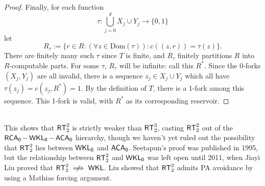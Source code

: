 \documentclass{amsart}
\begin{document}
\begin{proof}
		
		Finally, for each function
		$$
		\tau : \bigcup_{j=0}^d X_j\cup Y_j \to \{0,1\}
		$$
		let
		$$
		R_{\tau} := \{r\in R : (\forall z\in \textrm{Dom}(\tau)): c((z,r)) = \tau(z) \}.
		$$ 
		There are finitely many such $\tau$ since $T$ is finite, and $R_{\tau}$ finitely partitions $R$ into $R$-computable parts. For some $\tau$, $R_{\tau}$ will be infinite: call this $R^*$. Since the $0$-forks $(X_j,Y_j)$ are all invalid, there is a sequence $z_j\in X_j\cup Y_j$ which all have $\tau(z_j) = c(z_j,R^*)=1$. By the definition of $T$, there is a 1-fork among this sequence. This 1-fork is valid, with $R^*$ as its corresponding reservoir.
	\end{proof}\\
	
	This shows that $\operatorname{\sf{RT}}^2_2$ is strictly weaker than $\operatorname{\sf{RT}}^3_2$, casting $\operatorname{\sf{RT}}^2_2$ out of the $\operatorname{\sf{RCA_0}}-\operatorname{\sf{WKL_0}}-\operatorname{\sf{ACA_0}}$ hierarchy, though we haven't yet ruled out the possibility that $\operatorname{\sf{RT}}^2_2$ lies between $\operatorname{\sf{WKL_0}}$ and $\operatorname{\sf{ACA_0}}$. Seetapun's proof was published in 1995, but the relationship between $\operatorname{\sf{RT}}^2_2$ and $\operatorname{\sf{WKL_0}}$ was left open until 2011, when Jiayi Liu proved that $\RT^2_2\centernot\implies \sf{WKL}$. Liu showed that $\operatorname{\sf{RT}}^2_2$ admits PA avoidance by using a Mathias forcing argument.\\
	
\end{document}
